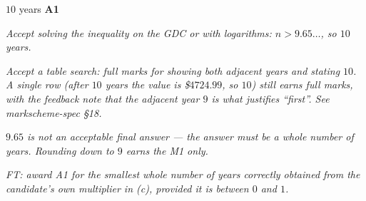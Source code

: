 \documentclass[12pt, twoside]{article}
\begin{document}
\begin{enumerate}[itemsep=0.3cm]
$10$ years \hfill \textbf{A1}

\emph{Accept solving the inequality on the GDC or with logarithms:
$n > 9.65\ldots$, so $10$ years.}

\emph{Accept a table search: full marks for showing both adjacent
years and stating $10$. A single row (after $10$ years the value is
\$$4724.99$, so $10$) still earns full marks, with the feedback note
that the adjacent year $9$ is what justifies ``first''. See
markscheme-spec §18.}

\emph{$9.65$ is not an acceptable final answer --- the answer must be
a whole number of years. Rounding down to $9$ earns the M1 only.}

\emph{FT: award A1 for the smallest whole number of years correctly
obtained from the candidate's own multiplier in (c), provided it is
between $0$ and $1$.}

\end{enumerate}
\end{document}
